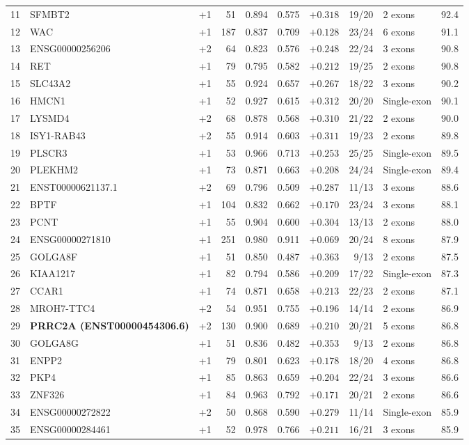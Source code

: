 \documentclass[10pt,letterpaper]{article}
\begin{document}
{\begin{longtable}{@{}rlcrrrrrlr@{}}
11 & SFMBT2 & +1 & 51 & 0.894 & 0.575 & $+0.318$ & 19/20 & 2 exons & 92.4 \\
12 & WAC & +1 & 187 & 0.837 & 0.709 & $+0.128$ & 23/24 & 6 exons & 91.1 \\
13 & ENSG00000256206 & +2 & 64 & 0.823 & 0.576 & $+0.248$ & 22/24 & 3 exons & 90.8 \\
14 & RET & +1 & 79 & 0.795 & 0.582 & $+0.212$ & 19/25 & 2 exons & 90.8 \\
15 & SLC43A2 & +1 & 55 & 0.924 & 0.657 & $+0.267$ & 18/22 & 3 exons & 90.2 \\
16 & HMCN1 & +1 & 52 & 0.927 & 0.615 & $+0.312$ & 20/20 & Single-exon & 90.1 \\
17 & LYSMD4 & +2 & 68 & 0.878 & 0.568 & $+0.310$ & 21/22 & 2 exons & 90.0 \\
18 & ISY1-RAB43 & +2 & 55 & 0.914 & 0.603 & $+0.311$ & 19/23 & 2 exons & 89.8 \\
19 & PLSCR3 & +1 & 53 & 0.966 & 0.713 & $+0.253$ & 25/25 & Single-exon & 89.5 \\
20 & PLEKHM2 & +1 & 73 & 0.871 & 0.663 & $+0.208$ & 24/24 & Single-exon & 89.4 \\
21 & ENST00000621137.1 & +2 & 69 & 0.796 & 0.509 & $+0.287$ & 11/13 & 3 exons & 88.6 \\
22 & BPTF & +1 & 104 & 0.832 & 0.662 & $+0.170$ & 23/24 & 3 exons & 88.1 \\
23 & PCNT & +1 & 55 & 0.904 & 0.600 & $+0.304$ & 13/13 & 2 exons & 88.0 \\
24 & ENSG00000271810 & +1 & 251 & 0.980 & 0.911 & $+0.069$ & 20/24 & 8 exons & 87.9 \\
25 & GOLGA8F & +1 & 51 & 0.850 & 0.487 & $+0.363$ & 9/13 & 2 exons & 87.5 \\
26 & KIAA1217 & +1 & 82 & 0.794 & 0.586 & $+0.209$ & 17/22 & Single-exon & 87.3 \\
27 & CCAR1 & +1 & 74 & 0.871 & 0.658 & $+0.213$ & 22/23 & 2 exons & 87.1 \\
28 & MROH7-TTC4 & +2 & 54 & 0.951 & 0.755 & $+0.196$ & 14/14 & 2 exons & 86.9 \\
29 & \textbf{PRRC2A (ENST00000454306.6)} & +2 & 130 & 0.900 & 0.689 & $+0.210$ & 20/21 & 5 exons & 86.8 \\
30 & GOLGA8G & +1 & 51 & 0.836 & 0.482 & $+0.353$ & 9/13 & 2 exons & 86.8 \\
31 & ENPP2 & +1 & 79 & 0.801 & 0.623 & $+0.178$ & 18/20 & 4 exons & 86.8 \\
32 & PKP4 & +1 & 85 & 0.863 & 0.659 & $+0.204$ & 22/24 & 3 exons & 86.6 \\
33 & ZNF326 & +1 & 84 & 0.963 & 0.792 & $+0.171$ & 20/21 & 2 exons & 86.6 \\
34 & ENSG00000272822 & +2 & 50 & 0.868 & 0.590 & $+0.279$ & 11/14 & Single-exon & 85.9 \\
35 & ENSG00000284461 & +1 & 52 & 0.978 & 0.766 & $+0.211$ & 16/21 & 3 exons & 85.9 \\
\end{longtable}
}
\end{document}
